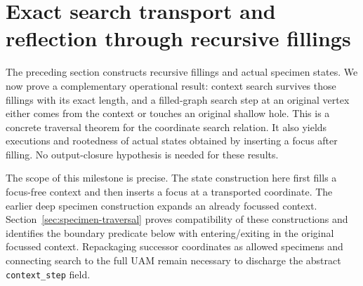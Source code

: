 \section{Exact search transport and reflection through recursive fillings}
\label{sec:expansion-search}
The preceding section constructs recursive fillings and actual specimen states.
We now prove a complementary operational result: context search survives those
fillings with its exact length, and a filled-graph search step at an original
vertex either comes from the context or touches an original shallow hole.
This is a concrete traversal theorem for the coordinate search relation.
It also yields executions and rootedness of actual states obtained by inserting
a focus after filling. No output-closure hypothesis is needed for these results.

The scope of this milestone is precise. The state construction here first fills
a focus-free context and then inserts a focus at a transported coordinate.
The earlier deep specimen construction expands an already focussed context.
Section~\ref{sec:specimen-traversal} proves compatibility of these constructions
and identifies the boundary predicate below with entering/exiting in the original
focussed context. Repackaging successor coordinates as allowed specimens and
connecting search to the full UAM remain necessary to discharge the abstract
\texttt{context\_step} field.

